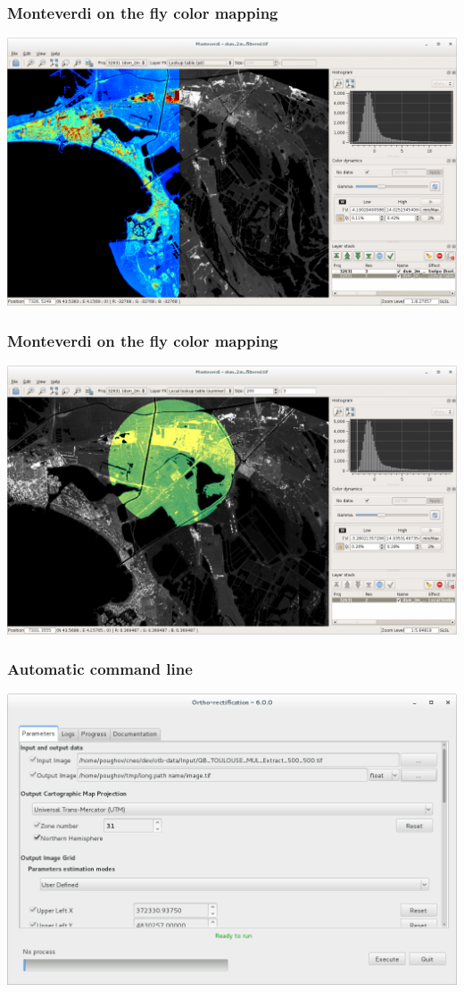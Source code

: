 \documentclass[smaller]{beamer}
\begin{document}
\begin{frame}
\frametitle{Monteverdi on the fly color mapping}
\includegraphics[width=1\textwidth]{images/monteverdi-colormapping.png}
\end{frame}

\begin{frame}
\frametitle{Monteverdi on the fly color mapping}
\includegraphics[width=1\textwidth]{images/monteverdi-colormapping2.png}
\end{frame}

\begin{frame}
\frametitle{Automatic command line}
\includegraphics[width=1\textwidth]{images/automatic_command_line1.png}
\end{frame}
\end{document}
